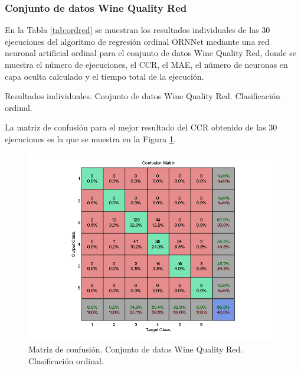 			\subsubsection{Conjunto de datos Wine Quality Red}
			
			En la Tabla \ref{tab:ordred} se muestran los resultados individuales de las 30 ejecuciones del algoritmo de regresión ordinal ORNNet mediante una red neuronal artificial ordinal para el conjunto de datos Wine Quality Red, donde se muestra el número de ejecuciones, el CCR, el MAE, el número de neuronas en capa oculta calculado y el tiempo total de la ejecución.\\
			
			\begin{table}[!htbp]
				\centering
				\caption{Resultados individuales. Conjunto de datos Wine Quality Red. Clasificación ordinal.}
				\label{tab:ordred}
			\end{table}
			
			La matriz de confusión para el mejor resultado del CCR obtenido de las 30 ejecuciones es la que se muestra en la Figura \ref{fig:ordred}.
			
			\begin{figure}[htbp]
				\centering
				\includegraphics[scale=0.8]{../src/results/ordinal/winequality-red_mc1.png}
				\caption{Matriz de confusión. Conjunto de datos Wine Quality Red. Clasificación ordinal.}
				\label{fig:ordred}
			\end{figure}
			
